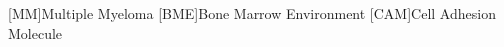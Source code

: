 
\label{sec:Abbreviations}

\begin{acronym}
    [MM]{Multiple Myeloma}
    [BME]{Bone Marrow Environment}
    [CAM]{Cell Adhesion Molecule}
\end{acronym}